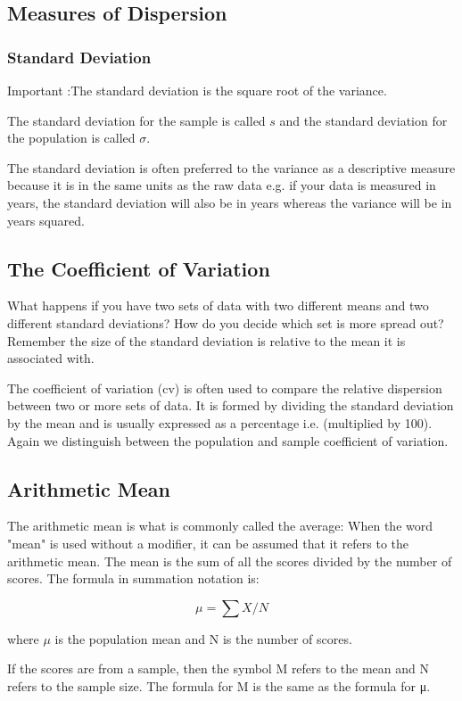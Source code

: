 \documentclass[12pt]{article}
\begin{document}
\subsection{Measures of Dispersion}
\subsubsection{Standard Deviation}
Important :The standard deviation  is the square root of the variance.

The standard deviation for the sample is called $s$ and the standard deviation for the population is called $\sigma$.

The standard deviation is often preferred to the variance as a descriptive measure because it is in the same units as the raw data e.g. if your data is measured in years, the standard deviation will also be in years whereas the variance will be in years squared.

\subsection{The Coefficient of Variation}

What happens if you have two sets of data with two different means and two different standard deviations? How do you decide which set is more spread out? Remember the size of the standard deviation is relative to the mean it is associated with.

The coefficient of variation (cv) is often used to compare the relative dispersion between two or more sets of data. It is formed by dividing the standard deviation by the mean and is usually expressed as a percentage i.e. (multiplied by 100). Again we distinguish between the population and sample coefficient of variation.

\subsection{Arithmetic Mean}
The arithmetic mean is what is commonly called the average: When the word "mean" is used without a modifier, it can be assumed that it refers to the arithmetic mean. The mean is the sum of all the scores divided by the number of scores. The formula in summation notation is:

\[\mu = \sum X/N\]

where $\mu$ is the population mean and N is the number of scores. 

If the scores are from a sample, then the symbol M refers to the mean and N refers to the sample size. The formula for M is the same as the formula for
μ. 
\end{document}
